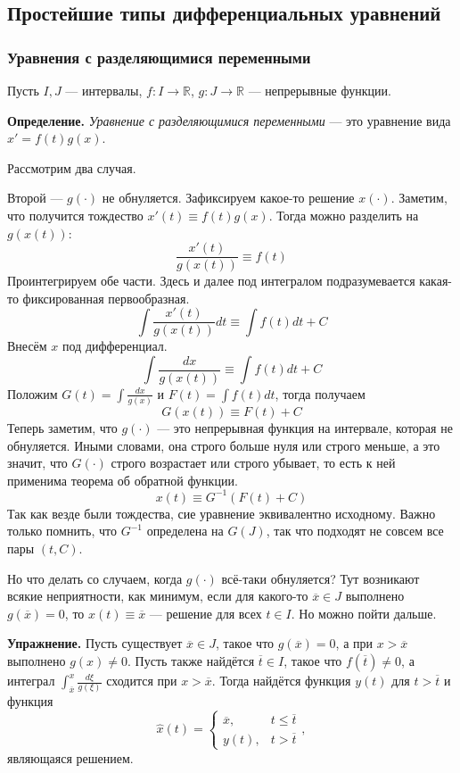 \subsection{Простейшие типы дифференциальных уравнений}
\subsubsection{Уравнения с разделяющимися переменными}
Пусть $I, J$ --- интервалы, $f: I \to \mathbb R$, $g: J \to \mathbb R$ --- непрерывные функции. 

\textbf{Определение.} \textit{Уравнение с разделяющимися переменными} --- это уравнение вида $x' = f(t) g(x)$.


Рассмотрим два случая. 

Второй --- $g(\cdot)$ не обнуляется.
Зафиксируем какое-то решение $x(\cdot)$. Заметим, что получится тождество $x'(t) \equiv f(t) g(x)$. Тогда можно разделить на $g(x(t))$:
\[
    \frac{x'(t)}{g(x(t))} \equiv f(t)
\]
Проинтегрируем обе части. Здесь и далее под интегралом подразумевается какая-то фиксированная первообразная.
\[
    \int \frac{x'(t)}{g(x(t))} dt \equiv \int f(t)dt + C
\]
Внесём $x$ под дифференциал.
\[
    \int \frac{dx}{g(x(t))} \equiv \int f(t)dt + C
\]
Положим $G(t) = \int \frac{dx}{g(x)}$ и $F(t) = \int f(t) dt$, тогда получаем
\[
    G(x(t)) \equiv F(t) + C
\]
Теперь заметим, что $g(\cdot)$ --- это непрерывная функция на интервале, которая не обнуляется.
Иными словами, она строго больше нуля или строго меньше, а это значит, что $G(\cdot)$ строго возрастает или строго убывает, то есть к ней применима теорема об обратной функции.
\[
    x(t) \equiv G^{-1}(F(t) + C)
\]
Так как везде были тождества, сие уравнение эквивалентно исходному.
Важно только помнить, что $G^{-1}$ определена на $G(J)$, так что подходят не совсем все пары $(t, C)$.

Но что делать со случаем, когда $g(\cdot)$ всё-таки обнуляется?
Тут возникают всякие неприятности, как минимум, если для какого-то $\overline{x} \in J$ выполнено $g(\overline{x}) = 0$, то $x(t) \equiv \overline{x}$ --- решение для всех $t \in I$.
Но можно пойти дальше.

\textbf{Упражнение.} Пусть существует $\overline x \in J$, такое что $g(\overline x) = 0$, а при $x > \overline x$ выполнено $g(x) \ne 0$.
Пусть также найдётся $\overline t \in I$, такое что $f(\overline t) \ne 0$, а интеграл $\int_{\overline x}^x \frac{d\xi}{g(\xi)}$ сходится при $x > \overline x$.
Тогда найдётся функция $y(t)$ для $t > \overline t$ и функция
\[
    \widehat x(t) =
    \begin{cases}
        \overline x, & t \le \overline t \\
        y(t), & t > \overline t
    \end{cases},
\]
являющаяся решением.

